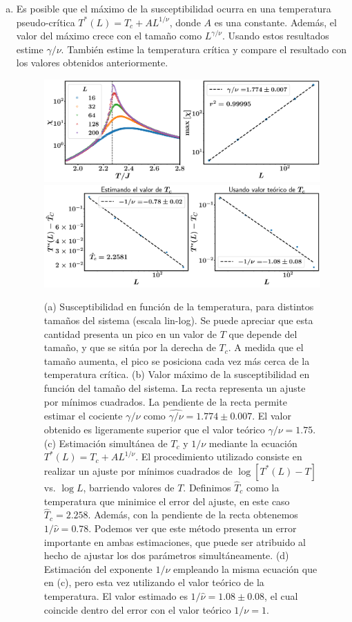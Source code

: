 \documentclass[10pt]{article}
\begin{document}
\begin{enumerate}[a)]
\pagebreak

\item Es posible que el máximo de la susceptibilidad ocurra en una temperatura pseudo-crítica $T^*(L) = T_c + A L^{1/\nu}$, donde $A$ es una constante. Además, el valor del máximo crece con el tamaño como $L^{\gamma/\nu}$. Usando estos resultados estime $\gamma / \nu$. También estime la temperatura crítica y compare el resultado con los valores obtenidos anteriormente.

\begin{figure}[ht]
\centering
\includegraphics[scale=0.27]{Fig6.pdf}
\includegraphics[scale=0.27]{Fig7.pdf}
\caption{(a) Susceptibilidad en función de la temperatura, para distintos tamaños del sistema (escala lin-log). Se puede apreciar que esta cantidad presenta un pico en un valor de $T$ que depende del tamaño, y que se sitúa por la derecha de $T_c$. A medida que el tamaño aumenta, el pico se posiciona cada vez más cerca de la temperatura crítica. (b) Valor máximo de la susceptibilidad en función del tamaño del sistema. La recta representa un ajuste por mínimos cuadrados. La pendiente de la recta permite estimar el cociente $\gamma/\nu$ como $\hat{\gamma/\nu} = 1.774\pm 0.007$. El valor obtenido es ligeramente superior que el valor teórico $\gamma /\nu = 1.75$. (c) Estimación simultánea de $T_c$ y $1/\nu$ mediante la ecuación  $T^*(L) = T_c + A L^{1/\nu}$. El procedimiento utilizado consiste en realizar un ajuste por mínimos cuadrados de $\log [T^*(L) - T]$ vs. $\log L$, barriendo valores de $T$. Definimos $\hat{T}_c$ como la temperatura que minimice el error del ajuste, en este caso $\hat{T}_c = 2.258$. Además, con la pendiente de la recta obtenemos $1/\hat{\nu} = 0.78$. Podemos ver que este método presenta un error importante en ambas estimaciones, que puede ser atribuido al hecho de ajustar los dos parámetros simultáneamente. (d) Estimación del exponente $1/\nu$ empleando la misma ecuación que en (c), pero esta vez utilizando el valor teórico de la temperatura. El valor estimado es $1/\hat{\nu} = 1.08\pm 0.08$, el cual coincide dentro del error con el valor teórico $1/\nu = 1$.}
\end{figure}


\end{enumerate}
\end{document}
